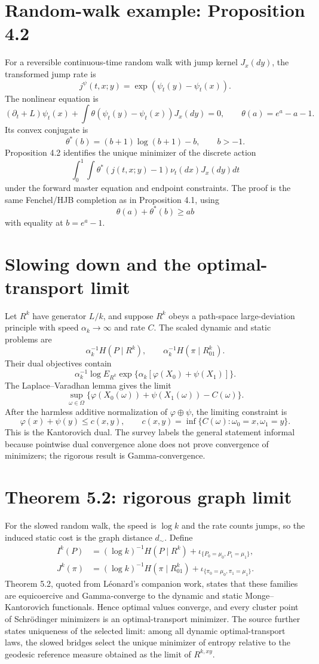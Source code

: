 \section{Random-walk example: Proposition 4.2}
For a reversible continuous-time random walk with jump kernel \(J_x(dy)\), the transformed jump
rate is
\[
 j^\psi(t,x;y)=\exp(\psi_t(y)-\psi_t(x)).
\]
The nonlinear equation is
\[
 (\partial_t+L)\psi_t(x)+
 \int\theta(\psi_t(y)-\psi_t(x))J_x(dy)=0,
 \qquad
 \theta(a)=e^a-a-1.
\]
Its convex conjugate is
\[
 \theta^*(b)=(b+1)\log(b+1)-b,
 \qquad b>-1.
\]
Proposition 4.2 identifies the unique minimizer of the discrete action
\[
 \int_0^1\int\theta^*(j(t,x;y)-1)\nu_t(dx)J_x(dy)dt
\]
under the forward master equation and endpoint constraints.  The proof is the same Fenchel/HJB
completion as in Proposition 4.1, using
\[
 \theta(a)+\theta^*(b)\ge ab
\]
with equality at \(b=e^a-1\).

\section{Slowing down and the optimal-transport limit}
Let \(R^k\) have generator \(L/k\), and suppose \(R^k\) obeys a path-space large-deviation
principle with speed \(\alpha_k\to\infty\) and rate \(C\).  The scaled dynamic and static problems are
\[
 \alpha_k^{-1}H(P\mid R^k),
 \qquad
 \alpha_k^{-1}H(\pi\mid R^k_{01}).
\]
Their dual objectives contain
\[
 \alpha_k^{-1}\log E_{R^k}
 \exp\{\alpha_k[\varphi(X_0)+\psi(X_1)]\}.
\]
The Laplace--Varadhan lemma gives the limit
\[
 \sup_{\omega\in\Omega}
 \{\varphi(X_0(\omega))+\psi(X_1(\omega))-C(\omega)\}.
\]
After the harmless additive normalization of \(\varphi\oplus\psi\), the limiting constraint is
\[
 \varphi(x)+\psi(y)\le c(x,y),
 \qquad
 c(x,y)=\inf\{C(\omega):\omega_0=x,\omega_1=y\}.
\]
This is the Kantorovich dual.  The survey labels the general statement informal because pointwise
dual convergence alone does not prove convergence of minimizers; the rigorous result is
Gamma-convergence.

\section{Theorem 5.2: rigorous graph limit}
For the slowed random walk, the speed is \(\log k\) and the rate counts jumps, so the induced static
cost is the graph distance \(d_\sim\).  Define
\begin{align*}
 I^k(P)&=(\log k)^{-1}H(P\mid R^k)+
  \iota_{\{P_0=\mu_0,P_1=\mu_1\}},\\
 J^k(\pi)&=(\log k)^{-1}H(\pi\mid R^k_{01})+
  \iota_{\{\pi_0=\mu_0,\pi_1=\mu_1\}}.
\end{align*}
Theorem 5.2, quoted from L\'eonard's companion work, states that these families are equicoercive and
Gamma-converge to the dynamic and static Monge--Kantorovich functionals.  Hence optimal values
converge, and every cluster point of Schr\"odinger minimizers is an optimal-transport minimizer.
The source further states uniqueness of the selected limit: among all dynamic optimal-transport
laws, the slowed bridges select the unique minimizer of entropy relative to the geodesic reference
measure obtained as the limit of \(R^{k,xy}\).

